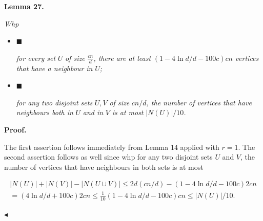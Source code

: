 \documentclass[10pt,a4paper]{article}
\begin{document}


\par\medskip\noindent\textbf{
\textbf{Lemma 27}\textbf{.}
}\par



\emph{Whp}\par


\begin{itemize}


\item[] 
$\blacksquare$ 


\emph{for every set }$U$\emph{ of size }$\frac{cn}{d}$\emph{, there are at least }$(1-4\ln d/d-100c)cn$\emph{ vertices that have a neighbour in }$U$\emph{;}\par





\item[] 
$\blacksquare$ 


\emph{for any two disjoint sets }$U,V$\emph{ of size }$cn/d$\emph{, the number of vertices that have neighbours both in }$U$\emph{ and in }$V$\emph{ is at most }$|N(U)|/10$\emph{.}\par





\end{itemize}







\par\medskip\noindent\textbf{Proof.}\par




The first assertion follows immediately from Lemma 14 applied with $r=1$. The second assertion follows as well since whp for any two disjoint sets $U$ and $V$, the number of vertices that have neighbours in both sets is at most\par


\[\begin{gathered}
\displaystyle|N(U)|+|N(V)| \displaystyle-|N(U\cup V)|\leq 2d(cn/d)-(1-4\ln d/d-100c)2cn \\
\displaystyle=(4\ln d/d+100c)2cn\leq\frac{1}{10}(1-4\ln d/d-100c)cn\leq|N(U)|/10.\
\end{gathered}\]


$\blacktriangleleft$\par
\end{document}
